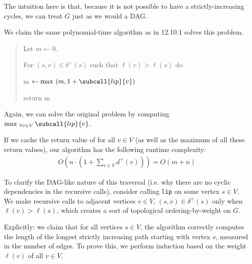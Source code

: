 \documentclass{article}
\begin{document}
\begin{solution}
The intuition here is that, because it is not possible to have a strictly-increasing cycles, we can treat \( G \) just as we would a DAG.

We claim the same polynomial-time algorithm as in 12.10.1 solves this problem.

\begin{quote}%


\begin{steps}
  \item Let \( m \leftarrow 0 \).
  \item For \( (s,v)\in \delta^+(s) \) such that \( \ell(v) > \ell(s) \) do
    \begin{steps}
        \item m \( \leftarrow \max \ (m, 1 + \subcall{lip}{v}) \)
    \end{steps}
  \item return m
\end{steps}
\end{quote}

Again, we can solve the original problem by computing \(\max_{ \ \forall v\in V}\subcall{lip}{v}\).

\begin{subproof}[Runtime]
If we cache the return value of  for all \( v \in V \) (as well as the maximum of all these return values), our algorithm has the following runtime complexity:
\begin{align*}
    O \left( n \cdot \left( 1+\sum_{v\in V} d^+(v) \right) \right) = O \left( m+n \right)
\end{align*}
\end{subproof}

\begin{subproof}[Correctness]
To clarify the DAG-like nature of this traversal (i.e. why there are no cyclic dependencies in the recursive calls), consider calling \texttt{lip} on some vertex \( s \in V \). We make recursive calls to adjacent vertices \( v \in V \), \( (s,v) \in \delta^{+}(s) \) only when \( \ell(v) > \ell(s) \), which creates a sort of topological ordering-by-weight on \( G \).

Explicitly: we claim that for all vertices \( s \in V \), the algorithm correctly computes the length of the longest strictly increasing path starting with vertex \( s \), measured in the number of edges. To prove this, we perform induction based on the weight \( \ell(v) \) of all \( v \in V \).


\end{subproof}
\end{solution}
\end{document}
